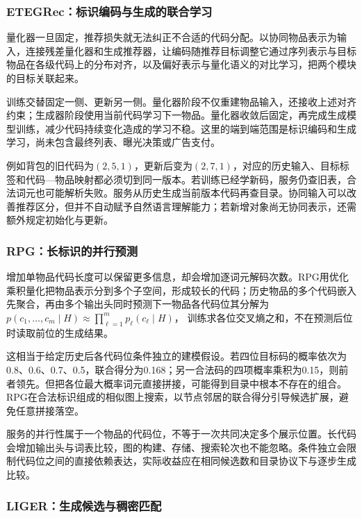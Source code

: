 \subsubsection{ETEGRec：标识编码与生成的联合学习}
\label{sec:rs-etegrec}

量化器一旦固定，推荐损失就无法纠正不合适的代码分配。以协同物品表示为输入，连接残差量化器和生成推荐器，让编码随推荐目标调整它通过序列表示与目标物品在各级代码上的分布对齐，以及偏好表示与量化语义的对比学习，把两个模块的目标关联起来。

训练交替固定一侧、更新另一侧。量化器阶段不仅重建物品输入，还接收上述对齐约束；生成器阶段使用当前代码学习下一物品。量化器收敛后固定，再完成生成模型训练，减少代码持续变化造成的学习不稳。这里的端到端范围是标识编码和生成学习，尚未包含最终列表、曝光决策或广告支付。

例如背包的旧代码为$(2,5,1)$，更新后变为$(2,7,1)$，对应的历史输入、目标标签和代码—物品映射都必须切到同一版本。若训练已经学新码，服务仍查旧表，合法词元也可能解析失败。服务从历史生成当前版本代码再查目录。协同输入可以改善推荐区分，但并不自动赋予自然语言理解能力；若新增对象尚无协同表示，还需额外规定初始化与更新。

\subsubsection{RPG：长标识的并行预测}
\label{sec:rs-rpg}

增加单物品代码长度可以保留更多信息，却会增加逐词元解码次数。RPG用优化乘积量化把物品表示分到多个子空间，形成较长的代码；历史物品的多个代码嵌入先聚合，再由多个输出头同时预测下一物品各代码位其分解为
$p(c_1,\ldots,c_m\mid H)\approx\prod_{\ell=1}^m p_\ell(c_\ell\mid H)$，
训练求各位交叉熵之和，不在预测后位时读取前位的生成结果。

这相当于给定历史后各代码位条件独立的建模假设。若四位目标码的概率依次为0.8、0.6、0.7、0.5，联合得分为0.168；另一合法码的四项概率乘积为0.15，则前者领先。但把各位最大概率词元直接拼接，可能得到目录中根本不存在的组合。RPG在合法标识组成的相似图上搜索，以节点邻居的联合得分引导候选扩展，避免任意拼接落空。

服务的并行性属于一个物品的代码位，不等于一次共同决定多个展示位置。长代码会增加输出头与词表比较，图的构建、存储、搜索轮次也不能忽略。条件独立会限制代码位之间的直接依赖表达，实际收益应在相同候选数和目录协议下与逐步生成比较。

\Needspace{100mm}
\subsubsection{LIGER：生成候选与稠密匹配}
\label{sec:rs-liger}

